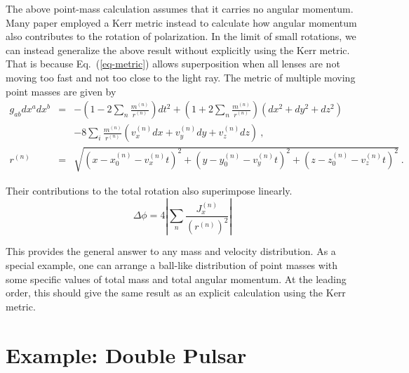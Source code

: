 \documentclass[aps,showpacs,onecolumn,floats,prd,superscriptaddress,nofootinbib]{revtex4}
\begin{document}
The above point-mass calculation assumes that it carries no angular momentum. Many paper employed a Kerr metric instead to calculate how angular momentum also contributes to the rotation of polarization. In the limit of small rotations, we can instead generalize the above result without explicitly using the Kerr metric. That is because Eq.~(\ref{eq-metric}) allows superposition when all lenses are not moving too fast and not too close to the light ray. The metric of multiple moving point masses are given by
\begin{eqnarray}
g_{ab}dx^adx^b &=& -\left( 1 - 2\sum_n \frac{m^{(n)}}{r^{(n)}} \right)dt^2
+\left( 1 + 2\sum_n \frac{m^{(n)}}{r^{(n)}} \right)(dx^2+dy^2+dz^2)
\\ \nonumber 
& & -8\sum_i \frac{m^{(n)} }{r^{(n)}}
\left(v^{(n)}_x dx + v^{(n)}_y dy+ v^{(n)}_z dz\right)~, \\
r^{(n)} &=& \sqrt{\left(x - x_0^{(n)} - v^{(n)}_x t\right)^2 + \left(y - y_0^{(n)} - v^{(n)}_y t\right)^2 
+ \left(z - z_0^{(n)} - v^{(n)}_z t\right)^2}~.
\end{eqnarray}

Their contributions to the total rotation also superimpose linearly.
\begin{equation}
\Delta\phi = 4 \left| \sum_n \frac{J_x^{(n)}}{\left(r^{(n)}\right)^2} \right|
\label{eq-combine}
\end{equation}

This provides the general answer to any mass and velocity distribution. As a special example, one can arrange a ball-like distribution of point masses with some specific values of total mass and total angular momentum.  At the leading order, this should give the same result as an explicit calculation using the Kerr metric.


\section{Example: Double Pulsar}
\label{sec-prediction}


\end{document}
